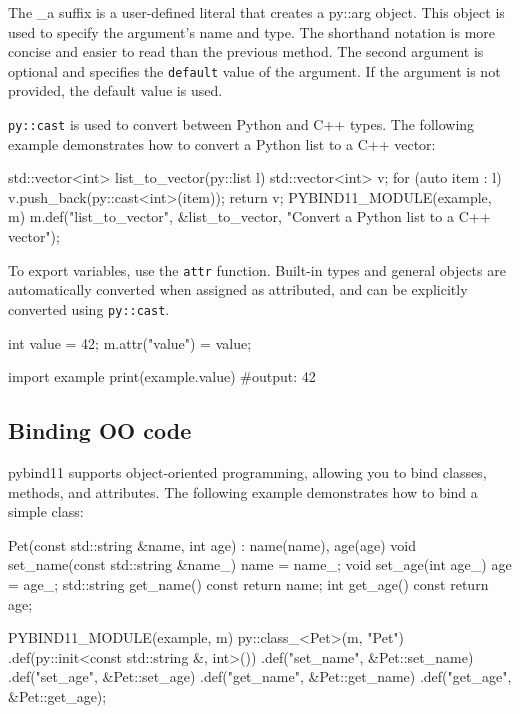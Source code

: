 The \_a suffix is a user-defined literal that creates a py::arg object. This object is used to specify the argument's name and type. The shorthand notation is more concise and easier to read than the previous method.
The second argument is optional and specifies the \texttt{default} value of the argument. If the argument is not provided, the default value is used.

\texttt{py::cast} is used to convert between Python and C++ types. The following example demonstrates how to convert a Python list to a C++ vector:

\begin{codeblock}[language=C++]
std::vector<int> list_to_vector(py::list l) {
    std::vector<int> v;
    for (auto item : l) {
        v.push_back(py::cast<int>(item));
    }
    return v;
}
PYBIND11_MODULE(example, m) {
    m.def("list_to_vector", &list_to_vector, "Convert a Python list to a C++ vector");
}
\end{codeblock}

To export variables, use the \texttt{attr} function. Built-in types and general objects are automatically converted when assigned as attributed, 
and can be explicitly converted using \texttt{py::cast}.

\begin{codeblock}[language=C++]
int value = 42;
m.attr("value") = value;
\end{codeblock}

\begin{codeblock}[language=python]
import example
print(example.value) #output: 42
\end{codeblock}

\subsection{Binding OO code}

pybind11 supports object-oriented programming, allowing you to bind classes, methods, and attributes. The following example demonstrates how to bind a simple class:

\begin{codeblock}[language=C++]
Pet(const std::string &name, int age) : name(name), age(age) {}
void set_name(const std::string &name_) { name = name_; }
void set_age(int age_) { age = age_; }
std::string get_name() const { return name; }
int get_age() const { return age; }
\end{codeblock}

\begin{codeblock}[language=C++]
PYBIND11_MODULE(example, m) {
    py::class_<Pet>(m, "Pet")
        .def(py::init<const std::string &, int>())
        .def("set_name", &Pet::set_name)
        .def("set_age", &Pet::set_age)
        .def("get_name", &Pet::get_name)
        .def("get_age", &Pet::get_age);
}
\end{codeblock}

